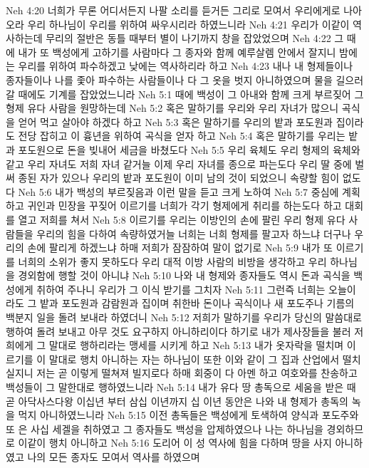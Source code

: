 Neh 4:20  너희가 무론 어디서든지 나팔 소리를 듣거든 그리로 모여서 우리에게로 나아오라 우리 하나님이 우리를 위하여 싸우시리라 하였느니라
Neh 4:21  우리가 이같이 역사하는데 무리의 절반은 동틀 때부터 별이 나기까지 창을 잡았었으며
Neh 4:22  그 때에 내가 또 백성에게 고하기를 사람마다 그 종자와 함께 예루살렘 안에서 잘지니 밤에는 우리를 위하여 파수하겠고 낮에는 역사하리라 하고
Neh 4:23  내나 내 형제들이나 종자들이나 나를 좇아 파수하는 사람들이나 다 그 옷을 벗지 아니하였으며 물을 길으러 갈 때에도 기계를 잡았었느니라
Neh 5:1  때에 백성이 그 아내와 함께 크게 부르짖어 그 형제 유다 사람을 원망하는데
Neh 5:2  혹은 말하기를 우리와 우리 자녀가 많으니 곡식을 얻어 먹고 살아야 하겠다 하고
Neh 5:3  혹은 말하기를 우리의 밭과 포도원과 집이라도 전당 잡히고 이 흉년을 위하여 곡식을 얻자 하고
Neh 5:4  혹은 말하기를 우리는 밭과 포도원으로 돈을 빚내어 세금을 바쳤도다
Neh 5:5  우리 육체도 우리 형제의 육체와 같고 우리 자녀도 저희 자녀 같거늘 이제 우리 자녀를 종으로 파는도다 우리 딸 중에 벌써 종된 자가 있으나 우리의 밭과 포도원이 이미 남의 것이 되었으니 속량할 힘이 없도다
Neh 5:6  내가 백성의 부르짖음과 이런 말을 듣고 크게 노하여
Neh 5:7  중심에 계획하고 귀인과 민장을 꾸짖어 이르기를 너희가 각기 형제에게 취리를 하는도다 하고 대회를 열고 저희를 쳐서
Neh 5:8  이르기를 우리는 이방인의 손에 팔린 우리 형제 유다 사람들을 우리의 힘을 다하여 속량하였거늘 너희는 너희 형제를 팔고자 하느냐 더구나 우리의 손에 팔리게 하겠느냐 하매 저희가 잠잠하여 말이 없기로
Neh 5:9  내가 또 이르기를 너희의 소위가 좋지 못하도다 우리 대적 이방 사람의 비방을 생각하고 우리 하나님을 경외함에 행할 것이 아니냐
Neh 5:10  나와 내 형제와 종자들도 역시 돈과 곡식을 백성에게 취하여 주나니 우리가 그 이식 받기를 그치자
Neh 5:11  그런즉 너희는 오늘이라도 그 밭과 포도원과 감람원과 집이며 취한바 돈이나 곡식이나 새 포도주나 기름의 백분지 일을 돌려 보내라 하였더니
Neh 5:12  저희가 말하기를 우리가 당신의 말씀대로 행하여 돌려 보내고 아무 것도 요구하지 아니하리이다 하기로 내가 제사장들을 불러 저희에게 그 말대로 행하리라는 맹세를 시키게 하고
Neh 5:13  내가 옷자락을 떨치며 이르기를 이 말대로 행치 아니하는 자는 하나님이 또한 이와 같이 그 집과 산업에서 떨치실지니 저는 곧 이렇게 떨쳐져 빌지로다 하매 회중이 다 아멘 하고 여호와를 찬송하고 백성들이 그 말한대로 행하였느니라
Neh 5:14  내가 유다 땅 총독으로 세움을 받은 때 곧 아닥사스다왕 이십년 부터 삼십 이년까지 십 이년 동안은 나와 내 형제가 총독의 녹을 먹지 아니하였느니라
Neh 5:15  이전 총독들은 백성에게 토색하여 양식과 포도주와 또 은 사십 세겔을 취하였고 그 종자들도 백성을 압제하였으나 나는 하나님을 경외하므로 이같이 행치 아니하고
Neh 5:16  도리어 이 성 역사에 힘을 다하며 땅을 사지 아니하였고 나의 모든 종자도 모여서 역사를 하였으며
